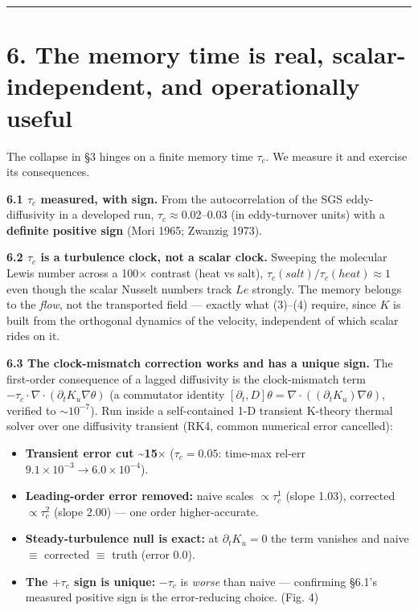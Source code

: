 \documentclass[11pt]{article}
\begin{document}
\medskip\hrule\medskip


\section*{6. The memory time is real, scalar-independent, and operationally useful}


The collapse in §3 hinges on a finite memory time $\tau _{c}$. We measure it and exercise its consequences.


\textbf{6.1 $\tau _{c}$ measured, with sign.} From the autocorrelation of the SGS eddy-diffusivity in a developed run, $\tau _{c}\approx 0.02–0.03$ (in eddy-turnover units) with a \textbf{definite positive sign} (Mori 1965; Zwanzig 1973).


\textbf{6.2 $\tau _{c}$ is a turbulence clock, not a scalar clock.} Sweeping the molecular Lewis number across a 100\ensuremath{\times} contrast (heat vs salt), $\tau _{c}(salt)/\tau _{c}(heat)\approx 1$ even though the scalar Nusselt numbers track $Le$ strongly. The memory belongs to the \emph{flow}, not the transported field — exactly what (3)–(4) require, since $K$ is built from the orthogonal dynamics of the velocity, independent of which scalar rides on it.


\textbf{6.3 The clock-mismatch correction works and has a unique sign.} The first-order consequence of a lagged diffusivity is the clock-mismatch term $-\tau _{c}\cdot \nabla \cdot (\partial _{t} K_{u} \nabla \theta )$ (a commutator identity $[\partial _{t}, D]\theta  = \nabla \cdot ((\partial _{t} K_{u})\nabla \theta )$, verified to $\sim 10^{-7}$). Run inside a self-contained 1-D transient K-theory thermal solver over one diffusivity transient (RK4, common numerical error cancelled):


\begin{itemize}
\item \textbf{Transient error cut \textasciitilde{}15\ensuremath{\times}} ($\tau _{c}=0.05$: time-max rel-err $9.1\times 10^{-3} \to  6.0\times 10^{-4}$).
\item \textbf{Leading-order error removed:} naive scales $\propto \tau _{c}^{1}$ (slope 1.03), corrected $\propto \tau _{c}^{2}$ (slope 2.00) — one order higher-accurate.
\item \textbf{Steady-turbulence null is exact:} at $\partial _{t} K_{u}=0$ the term vanishes and naive \ensuremath{\equiv} corrected \ensuremath{\equiv} truth (error 0.0).
\item \textbf{The $+\tau _{c}$ sign is unique:} $-\tau _{c}$ is \emph{worse} than naive — confirming §6.1's measured positive sign is the error-reducing choice. (Fig. 4)
\end{itemize}
\end{document}
